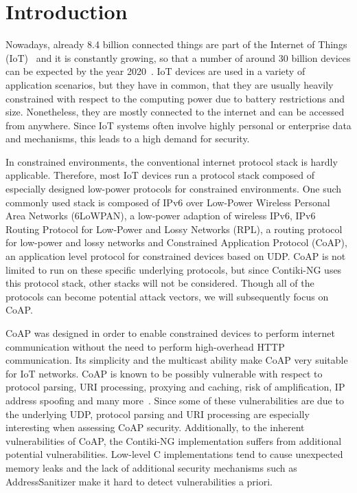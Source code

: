 \section{Introduction}
\label{section:introduction}


Nowadays, already 8.4 billion connected things are part of the Internet of Things (IoT)~\cite{IoTForecastGartner} and it is constantly growing, so that a number of around 30 billion devices can be expected by the year 2020~\cite{IoTForecastNordrum}. IoT devices are used in a variety of application scenarios, but they have in common, that they are usually heavily constrained with respect to the computing power due to battery restrictions and size. Nonetheless, they are mostly connected to the internet and can be accessed from anywhere. Since IoT systems often involve highly personal or enterprise data and mechanisms, this leads to a high demand for security.

In constrained environments, the conventional internet protocol stack is hardly applicable. Therefore, most IoT devices run a protocol stack composed of especially designed low-power protocols for constrained environments. One such commonly used stack is composed of IPv6 over Low-Power Wireless Personal Area Networks (6LoWPAN), a low-power adaption of wireless IPv6, IPv6 Routing Protocol for Low-Power and Lossy Networks (RPL), a routing protocol for low-power and lossy networks and Constrained Application Protocol (CoAP), an application level protocol for constrained devices based on UDP. CoAP is not limited to run on these specific underlying protocols, but since Contiki-NG uses this protocol stack, other stacks will not be considered. Though all of the protocols can become potential attack vectors, we will subsequently focus on CoAP.

CoAP was designed in order to enable constrained devices to perform internet communication without the need to perform high-overhead HTTP communication. Its simplicity and the multicast ability make CoAP very suitable for IoT networks.
CoAP is known to be possibly vulnerable with respect to protocol parsing, URI processing, proxying and caching, risk of amplification, IP address spoofing and many more~\cite{RFC7252}. Since some of these vulnerabilities are due to the underlying UDP, protocol parsing and URI processing are especially interesting when assessing CoAP security. Additionally, to the inherent vulnerabilities of CoAP, the Contiki-NG implementation suffers from additional potential vulnerabilities. Low-level C implementations tend to cause unexpected memory leaks and the lack of additional security mechanisms such as AddressSanitizer make it hard to detect vulnerabilities a priori.

